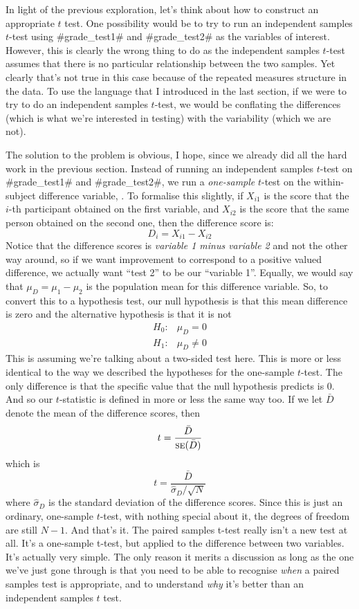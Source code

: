 
In light of the previous exploration, let's think about how to construct an appropriate $t$ test. One possibility would be to try to run an independent samples $t$-test using \rtextverb#grade_test1# and \rtextverb#grade_test2# as the variables of interest. However, this is clearly the wrong thing to do as the independent samples $t$-test assumes that there is no particular relationship between the two samples. Yet clearly that's not true in this case because of the repeated measures structure in the data. To use the language that I introduced in the last section, if we were to try to do an independent samples $t$-test, we would be conflating the  differences (which is what we're interested in testing) with the  variability (which we are not). 

The solution to the problem is obvious, I hope, since we already did all the hard work in the previous section. Instead of running an independent samples $t$-test on \rtextverb#grade_test1# and \rtextverb#grade_test2#, we run a {\it one-sample} $t$-test on the within-subject difference variable, . To formalise this slightly, if $X_{i1}$ is the score that the $i$-th participant obtained on the first variable, and $X_{i2}$ is the score that the same person obtained on the second one, then the difference score is:
$$
D_{i} = X_{i1} - X_{i2} 
$$
Notice that the difference scores is {\it variable 1 minus variable 2} and not the other way around, so if we want improvement to correspond to a positive valued difference, we actually want ``test 2'' to be our ``variable 1''. Equally, we would say that $\mu_D = \mu_1 - \mu_2$ is the population mean for this difference variable. So, to convert this to a hypothesis test, our null hypothesis is that this mean difference is zero and the alternative hypothesis is that it is not
$$
\begin{array}{ll}
H_0: & \mu_D = 0  \\
H_1: & \mu_D \neq 0
\end{array}
$$
This is assuming we're talking about a two-sided test here. This is more or less identical to the way we described the hypotheses for the one-sample $t$-test. The only difference is that the specific value that the null hypothesis predicts is 0. And so our $t$-statistic is defined in more or less the same way too. If we let $\bar{D}$ denote the mean of the difference scores, then 
$$
t = \frac{\bar{D}}{\mbox{\textsc{se}}(\bar{D})}
$$
which is 
$$
t = \frac{\bar{D}}{\hat\sigma_D / \sqrt{N}}
$$
where $\hat\sigma_D$ is the standard deviation of the difference scores. Since this is just an ordinary, one-sample $t$-test, with nothing special about it, the degrees of freedom are still $N-1$. And that’s it. The paired samples t-test really isn’t a new test at all. It’s a one-sample t-test, but applied to the difference between two variables. It's actually very simple. The only reason it merits a discussion as long as the one we've just gone through is that you need to be able to recognise {\it when} a paired samples test is appropriate, and to understand {\it why} it's better than an independent samples $t$ test. 

